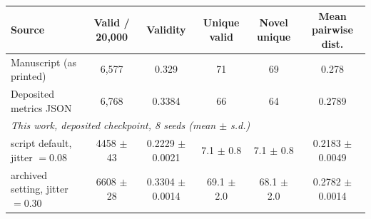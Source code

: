 \begin{tabular}{lccccc}
\toprule
Source & Valid / 20{,}000 & Validity & Unique valid & Novel unique & Mean pairwise dist. \\
\midrule
Manuscript (as printed) & 6{,}577 & 0.329 & 71 & 69 & 0.278 \\
Deposited metrics JSON & 6{,}768 & 0.3384 & 66 & 64 & 0.2789 \\
\midrule
\multicolumn{6}{l}{\emph{This work, deposited checkpoint, 8 seeds (mean $\pm$ s.d.)}} \\
\quad script default, jitter $=0.08$ & 4458 $\pm$ 43 & 0.2229 $\pm$ 0.0021 & 7.1 $\pm$ 0.8 & 7.1 $\pm$ 0.8 & 0.2183 $\pm$ 0.0049 \\
\quad archived setting, jitter $=0.30$ & 6608 $\pm$ 28 & 0.3304 $\pm$ 0.0014 & 69.1 $\pm$ 2.0 & 68.1 $\pm$ 2.0 & 0.2782 $\pm$ 0.0014 \\
\bottomrule
\end{tabular}
